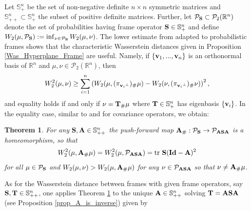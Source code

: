 \documentclass{amsart}
\numberwithin{equation}{section}
\newcommand\cP{{\mathcal P}}
\newcommand\bA{{\bf A}}
\newcommand\bS{{\bf S}}
\newcommand\bT{{\bf T}}
\newcommand\R{{\mathbb R}}
\newcommand\id{{\operatorname{\bf Id}}}
\newcommand\tr{{\operatorname{tr}}}
\theoremstyle{plain}
\newtheorem{theorem}[subsection]{Theorem}
\theoremstyle{definition}
\begin{document}
Let ${\mathbb S}^n_{+}$ be the set of non-negative definite $n\times n$ symmetric matrices and ${\mathbb S}^n_{++} \subset {\mathbb S}^n_{+}$ the 
subset of positive definite matrices. Further, let $\cP_{\bS} \subset \cP_2(\R^n)$ denote the set of probabilities having frame operator $\bS \in {\mathbb S}^n_{+}$ and define $ W_2(\mu, \cP_{\bS}):= \inf_{\nu \in \cP_{\bS}}  W_2(\mu, \nu) $. The lower estimate from \cite{cuesta1996lower} adapted to probabilistic frames shows that the characteristic Wasserstein distances given in Proposition \ref{Was_Hyperplane_Frame} are useful. Namely, if $\{{\bf v}_1,...,{\bf v}_n\}$ is an orthonormal basis of $\R^n$ and $\mu, \nu \in \cP_2(\R^n)$, then 
\begin{equation}%
    W^2_2(\mu,\nu)\geq \sum^n_{i=1} \left(W_2(\mu, (\pi_{{{\bf v}_i}^{\perp}})_{\#}\mu) - W_2(\nu, (\pi_{{{\bf v}_i}^{\perp}})_{\#}\nu) \right)^{2}, 
\end{equation}
and equality holds if and only if $\nu=\bT_{\#}\mu$ where $\bT \in {\mathbb S}^n_+$ has eigenbasis $\{{\bf v}_i\}$.  
In the equality case, similar to \cite{Gelbrich90} and \cite{olkin1982distance} for covariance operators, we obtain:  \begin{theorem}\label{thm_main_1}
For any $\bS, \bA  \in {\mathbb S}^n_{++}$ the push-forward map  
$\bA_{\#}: \cP_{\bS} \rightarrow \cP_{\bA\bS\bA}$ is a homeomorphism,  
so that 
\begin{equation}\label{thm_main_1_Wasserstein_dist}
W^2_2(\mu, \bA_{\#}\mu)  = W^2_2(\mu, \cP_{\bA\bS\bA})=\tr\ {\bf S}({\bf \id}-\bA)^2 
\end{equation} 
for all $\mu \in \cP_{\bS}$ and $W_2(\mu, \nu)  > W_2(\mu, \bA_{\#}\mu)$ for any $\nu \in \cP_{\bA\bS\bA}$ 
so that $\nu \neq \bA_{\#}\mu$. 
\end{theorem}
As for the Wasserstein distance between frames with given frame operators, say $\bS, \bT  \in {\mathbb S}^n_{++}$, 
one applies Theorem \ref{thm_main_1} to the unique $\bA \in {\mathbb S}^n_{++}$ solving
$\bT=\bA\bS\bA$ (see Proposition \ref{prop_A_is_inverse}) given by 
\end{document}
